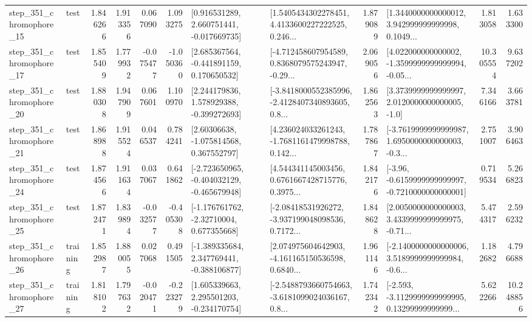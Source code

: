 \begin{tabular}{llrrrrllrlrr}
  step\_351\_chromophore\_15 &      test &      1.846266 &    1.913356 &      0.067090 &  1.093275 &    [0.916531289, 2.660751441, -0.017669735] &  [1.5405434302278451, 4.4133600227222525, 0.246... &       1.879089 &  [1.3440000000000012, 3.942999999999998, 0.1049... &            1.813058 &          1.633300 \\
  step\_351\_chromophore\_17 &      test &      1.855409 &    1.779932 &     -0.075477 & -1.050360 &    [2.685367564, -0.441891159, 0.170650532] &  [-4.712458607954589, 0.8368079575243947, -0.29... &       2.069056 &  [4.022000000000002, -1.3599999999999994, -0.05... &           10.305554 &          9.637202 \\
  step\_351\_chromophore\_20 &      test &      1.880308 &    1.947909 &      0.067601 &  1.100970 &    [2.244179836, 1.578929388, -0.399272693] &  [-3.8418000552385996, -2.4128407340893605, 0.8... &       1.862563 &     [3.3739999999999997, 2.0120000000000005, -1.0] &            7.346166 &          3.663781 \\
  step\_351\_chromophore\_21 &      test &      1.868988 &    1.915524 &      0.046537 &  0.784241 &     [2.60306638, -1.075814568, 0.367552797] &  [4.236024033261243, -1.7681161479998788, 0.142... &       1.787867 &  [-3.7619999999999987, 1.6950000000000003, -0.3... &            2.751007 &          3.906463 \\
  step\_351\_chromophore\_24 &      test &      1.874566 &    1.911634 &      0.037067 &  0.641862 &  [-2.723650965, -0.404032129, -0.465679948] &  [4.544341145003456, 0.6761667428715776, 0.3975... &       1.842176 &  [-3.96, -0.6159999999999997, -0.7210000000000001] &            0.719534 &          5.266823 \\
  step\_351\_chromophore\_25 &      test &      1.872471 &    1.839894 &     -0.032577 & -0.405308 &    [-1.176761762, -2.32710004, 0.677355668] &  [-2.08418531926272, -3.937199048098536, 0.7172... &       1.848628 &  [2.0050000000000003, 3.4339999999999975, -0.71... &            5.474317 &          2.596232 \\
  step\_351\_chromophore\_26 &  training &      1.852987 &    1.880055 &      0.027068 &  0.491505 &   [-1.389335684, 2.347769441, -0.388106877] &  [2.074975604642903, -4.161165150536598, 0.6840... &       1.961146 &  [-2.1400000000000006, 3.5189999999999984, -0.6... &            1.182682 &          4.796688 \\
  step\_351\_chromophore\_27 &  training &      1.818102 &    1.797632 &     -0.020471 & -0.223279 &    [1.605339663, 2.295501203, -0.234170754] &  [-2.5488793660754663, -3.6181099024036167, 0.8... &       1.742342 &  [-2.593, -3.1129999999999995, 0.13299999999999... &            5.622266 &         10.248856 \\

\end{tabular}
